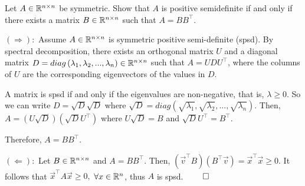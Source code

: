 \documentclass{article}
\begin{document}
	\begin{ex}
		Let $A\in\mathbb{R}^{n\times n}$  be symmetric. Show that $A$ is positive semidefinite if and only if there exists a matrix $B \in \mathbb{R}^{n\times n}$ such that $A = B B^\top$.
	\end{ex}
	
	\bigskip
	
	$\left( \Longrightarrow \right):$ Assume $A \in\mathbb{R}^{n\times n}$ is symmetric positive semi-definite (spsd). By spectral decomposition, there exists an orthogonal matrix $U$ and a diagonal matrix $D = diag \left( \lambda_1, \lambda_2, ..., \lambda_n \right) \in \mathbb{R}^{n\times n}$ such that $A = UDU^\top$, where the columns of $U$ are the corresponding eigenvectors of the values in $D$. 
	
	\medskip
	
	A matrix is spsd if and only if the eigenvalues are non-negative, that is, $\lambda \geq 0$. So we can write $D = \sqrt{D}\sqrt{D}$ where $\sqrt{D} = diag \left( \sqrt{\lambda_1}, \sqrt{\lambda_2}, ..., \sqrt{\lambda_n} \right)$. Then, $A = \left( U\sqrt{D} \right) \left( \sqrt{D}U^\top \right)$ where $U\sqrt{D} = B$ and $\sqrt{D}U^\top = B^\top.$ 
	
	\medskip
	
	Therefore, $A = BB^\top.$
	
	\bigskip
	
	$\left( \Longleftarrow \right):$ Let $B \in\mathbb{R}^{n\times n}$ and $A = BB^\top$. Then, $\left( \vec {v}^\top B \right) \left( B^\top \vec{v}  \right) = \vec{x}^\top \vec{x} \geq 0$. It follows that $\vec{x}^\top A \vec{x} \geq 0,$ $\forall x \in \mathbb{R}^n$, thus $A$ is spsd. $\qed$
	
    \bigskip
\end{document}
